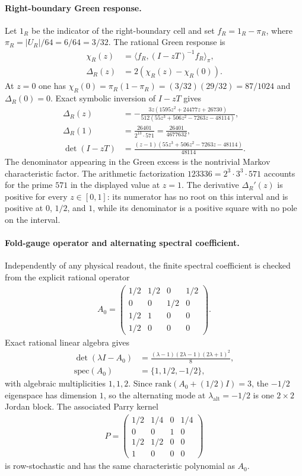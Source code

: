 \paragraph{Right-boundary Green response.}
Let $1_R$ be the indicator of the right-boundary cell and set $f_R=1_R-\pi_R$, where $\pi_R=|U_R|/64=6/64=3/32$. The rational Green response is
$$
\begin{aligned}
\chi_R(z)&=\langle f_R,(I-zT)^{-1}f_R\rangle_{\pi},\\
\Delta_R(z)&=2(\chi_R(z)-\chi_R(0)).
\end{aligned}
$$
At $z=0$ one has $\chi_R(0)=\pi_R(1-\pi_R)=(3/32)(29/32)=87/1024$ and $\Delta_R(0)=0$. Exact symbolic inversion of $I-zT$ gives
$$
\begin{aligned}
\Delta_R(z)&=-\frac{3z(1595z^2+24477z+26730)}{512(55z^3+506z^2-7263z-48114)},\\
\Delta_R(1)&=\frac{26401}{2^{13}\cdot 571}=\frac{26401}{4677632},\\
\det(I-zT)&=\frac{(z-1)(55z^3+506z^2-7263z-48114)}{48114}.
\end{aligned}
$$
The denominator appearing in the Green excess is the nontrivial Markov characteristic factor. The arithmetic factorization $123336=2^3\cdot 3^3\cdot 571$ accounts for the prime $571$ in the displayed value at $z=1$. The derivative $\Delta_R'(z)$ is positive for every $z\in[0,1]$: its numerator has no root on this interval and is positive at $0$, $1/2$, and $1$, while its denominator is a positive square with no pole on the interval.

\paragraph{Fold-gauge operator and alternating spectral coefficient.}
Independently of any physical readout, the finite spectral coefficient is checked from the explicit rational operator
$$
\begin{aligned}
A_0=\begin{pmatrix}
1/2&1/2&0&1/2\\
0&0&1/2&0\\
1/2&1&0&0\\
1/2&0&0&0
\end{pmatrix}.
\end{aligned}
$$
Exact rational linear algebra gives
$$
\begin{aligned}
\det(\lambda I-A_0)&=\frac{(\lambda-1)(2\lambda-1)(2\lambda+1)^2}{8},\\
\mathrm{spec}(A_0)&=\{1,1/2,-1/2\},
\end{aligned}
$$
with algebraic multiplicities $1,1,2$. Since $\mathrm{rank}(A_0+(1/2)I)=3$, the $-1/2$ eigenspace has dimension $1$, so the alternating mode at $\lambda_{\mathrm{alt}}=-1/2$ is one $2\times 2$ Jordan block. The associated Parry kernel
$$
\begin{aligned}
P=\begin{pmatrix}
1/2&1/4&0&1/4\\
0&0&1&0\\
1/2&1/2&0&0\\
1&0&0&0
\end{pmatrix}
\end{aligned}
$$
is row-stochastic and has the same characteristic polynomial as $A_0$.

